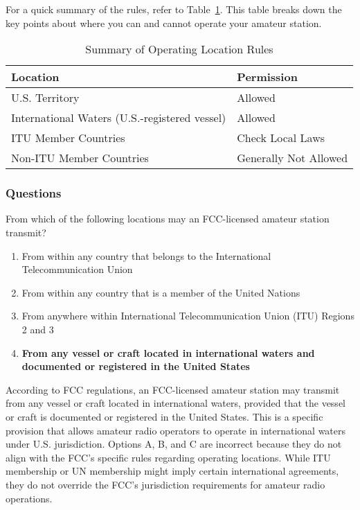 For a quick summary of the rules, refer to Table~\ref{tab:operating-location-summary}. This table breaks down the key points about where you can and cannot operate your amateur station.

\begin{table}[h]
    \centering
    \begin{tabular}{|l|l|}
        \hline
        \textbf{Location} & \textbf{Permission} \\
        \hline
        U.S. Territory & Allowed \\
        International Waters (U.S.-registered vessel) & Allowed \\
        ITU Member Countries & Check Local Laws \\
        Non-ITU Member Countries & Generally Not Allowed \\
        \hline
    \end{tabular}
    \caption{Summary of Operating Location Rules}
    \label{tab:operating-location-summary}
\end{table}

\subsubsection*{Questions}

\begin{tcolorbox}[colback=gray!10!white,colframe=black!75!black,title={T1C06}]
    From which of the following locations may an FCC-licensed amateur station transmit?
    \begin{enumerate}[label=\Alph*),noitemsep]
        \item From within any country that belongs to the International Telecommunication Union
        \item From within any country that is a member of the United Nations
        \item From anywhere within International Telecommunication Union (ITU) Regions 2 and 3
        \item \textbf{From any vessel or craft located in international waters and documented or registered in the United States}
    \end{enumerate}
\end{tcolorbox}

 According to FCC regulations, an FCC-licensed amateur station may transmit from any vessel or craft located in international waters, provided that the vessel or craft is documented or registered in the United States. This is a specific provision that allows amateur radio operators to operate in international waters under U.S. jurisdiction. Options A, B, and C are incorrect because they do not align with the FCC's specific rules regarding operating locations. While ITU membership or UN membership might imply certain international agreements, they do not override the FCC's jurisdiction requirements for amateur radio operations.
